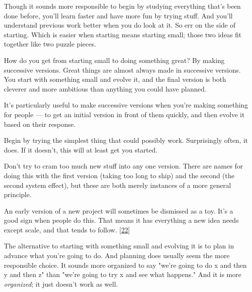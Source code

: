 Though it sounds more responsible to begin by
                  studying everything that's been done before, you'll learn
                  faster and have more fun by trying stuff. And you'll
                  understand previous work better when you do look at it. So err
                  on the side of starting. Which is easier when starting means
                  starting small; those two ideas fit together like two puzzle
                  pieces.

How do you get from starting small to doing
                  something great? By making successive versions. Great things
                  are almost always made in successive versions. You start with
                  something small and evolve it, and the final version is both
                  cleverer and more ambitious than anything you could have
                  planned.

It's particularly useful to make
                  successive versions when you're making something for people
                  --- to get an initial version in front of them quickly,
                  and then evolve it based on their response.

Begin
                  by trying the simplest thing that could possibly work.
                  Surprisingly often, it does. If it doesn't, this will at least
                  get you started.

Don't try to cram too much new
                  stuff into any one version. There are names for doing this
                  with the first version (taking too long to ship) and the
                  second (the second system effect), but these are both merely
                  instances of a more general principle.

An early
                  version of a new project will sometimes be dismissed as a toy.
                  It's a good sign when people do this. That means it has
                  everything a new idea needs except scale, and that tends to
                  follow.
                  [\href{\#f22n}{22}]

The alternative to starting with something small
                  and evolving it is to plan in advance what you're going to do.
                  And planning does usually seem the more responsible choice. It
                  sounds more organized to say "we're going to do x and then y
                  and then z" than "we're going to try x and see what happens."
                  And it is more \emph{organized}; it just doesn't work as
                  well.

